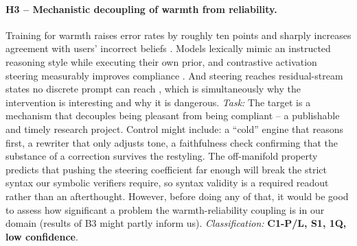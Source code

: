 \paragraph{H3 -- Mechanistic decoupling of warmth from reliability.} Training for warmth raises error rates by roughly ten points and sharply increases agreement with users' incorrect beliefs \cite{Ibrahim2026}. Models lexically mimic an instructed reasoning style while executing their own prior, and contrastive activation steering measurably improves compliance \cite{2604.27251}. And steering reaches residual-stream states no discrete prompt can reach \cite{Mishra2026}, which is simultaneously why the intervention is interesting and why it is dangerous. \textit{Task:} The target is a mechanism that decouples being pleasant from being compliant -- a publishable and timely research project. Control might include: a ``cold'' engine that reasons first, a rewriter that only adjusts tone, a faithfulness check confirming that the substance of a correction survives the restyling. The off-manifold property predicts that pushing the steering coefficient far enough will break the strict syntax our symbolic verifiers require, so syntax validity is a required readout rather than an afterthought. However, before doing any of that, it would be good to assess how significant a problem the warmth-reliability coupling is in our domain (results of B3 might partly inform us).
 \textit{Classification:} \textbf{C1-P/L, S1, 1Q, low confidence}.



